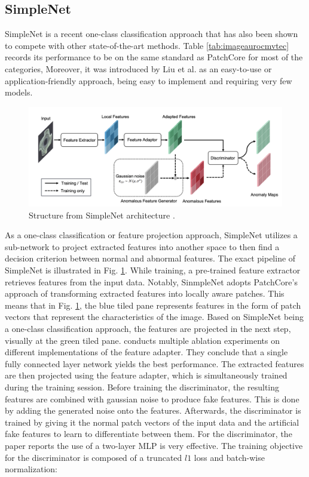 \subsection{SimpleNet}
\label{subsec:simplenet}
SimpleNet \cite{liu2023simplenet} is a recent one-class classification approach that has also been shown to compete with other state-of-the-art methods. Table \ref{tab:imageaurocmvtec} records its performance to be on the same standard as PatchCore 
for most of the categories, %
Moreover, it was introduced by Liu et al. as an easy-to-use or application-friendly approach, being easy to implement and requiring very few models.

\begin{figure}[H]
\centering
\includegraphics[width=\textwidth]{figures/simplenet_architecture.png}
\caption{Structure from SimpleNet architecture \cite{liu2023simplenet}.}
\label{fig:simplenetpipeline}
\end{figure}

As a one-class classification or feature projection approach, SimpleNet utilizes a sub-network to project extracted features into another space to then find a decision criterion between normal and 
abnormal features. The exact pipeline of SimpleNet is illustrated in Fig. \ref{fig:simplenetpipeline}. While training, a pre-trained feature extractor retrieves features from the input data. Notably, SinmpleNet adopts PatchCore's approach of transforming extracted features into locally aware patches. This means that in Fig. \ref{fig:simplenetpipeline}, the blue tiled pane represents features in the form of patch vectors 
that represent the characteristics of the image. Based on SimpleNet being a one-class classification approach, the features are projected in the next step, visually at the green tiled pane. 
\cite{liu2023simplenet} conducts multiple ablation experiments on different implementations of the feature adapter. They conclude that a single fully connected layer network yields the best 
performance. The extracted features are then projected using the feature adapter, which is simultaneously trained during the training session. Before training the discriminator, the resulting 
features are combined with gaussian noise to produce fake features. This is done by adding the generated noise onto the features. Afterwards, the discriminator is trained by giving it 
the normal patch vectors of the input data and the artificial fake features to learn to differentiate between them. For the discriminator, the paper reports the use of a two-layer 
MLP is very effective. The training objective for the discriminator is composed of a truncated $l1$ loss and batch-wise normalization:

